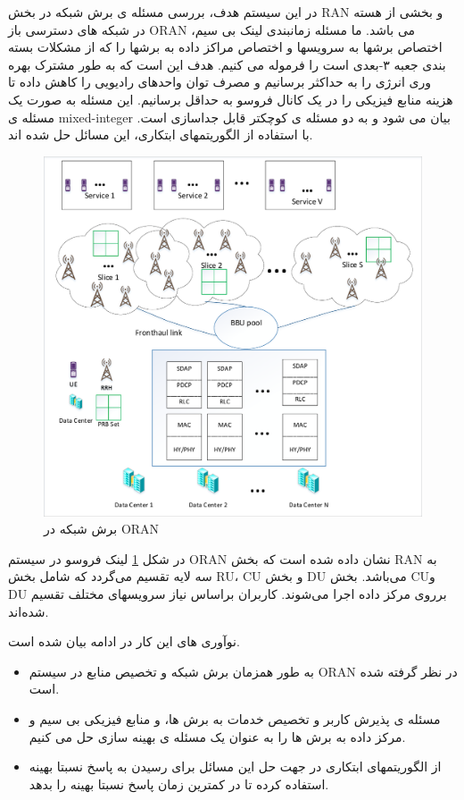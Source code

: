 در این سیستم هدف، بررسی مسئله ی برش شبکه در بخش RAN و بخشی از هسته در شبکه های دسترسی باز
ORAN
می باشد.
ما مسئله زمانبندی لینک بی سیم، اختصاص برشها به سرویسها و اختصاص مراکز داده به برشها را که از مشکلات بسته بندی جعبه  ۳-بعدی است را فرموله می کنیم. 
هدف این است که به طور مشترک بهره وری انرژی را به حداکثر برسانیم و مصرف توان واحدهای رادیویی را کاهش داده تا هزینه منابع فیزیکی را در یک کانال فروسو به حداقل برسانیم.
این مسئله به صورت یک مسئله ی 
mixed-integer
بیان می شود و به دو مسئله ی کوچکتر قابل جداسازی است. با استفاده از الگوریتمهای ابتکاری، این مسائل حل شده اند.
\begin{figure}
	\centering
	\includegraphics[scale=0.55]{./fig/c2.pdf}
	\caption{برش شبکه در ORAN}
	\label{fig:c11}
\end{figure}
در شکل \ref{fig:c11}
لینک فروسو در سیستم ORAN نشان داده شده است که بخش RAN به سه لایه تقسیم می‌گردد که شامل بخش RU، 
CU و
بخش DU می‌باشد.
بخش CUو DU برروی مرکز داده اجرا می‌شوند. کاربران براساس نیاز سرویسهای مختلف تقسیم شده‌اند.

نوآوری های این کار در ادامه بیان شده است.
\begin{itemize}
\item 
به طور همزمان برش شبکه و تخصیص منابع در سیستم
 ORAN
  در نظر گرفته شده است.
\item 
مسئله ی پذیرش کاربر و تخصیص خدمات به برش ها، و منابع فیزیکی بی سیم و مرکز داده به برش ها را به عنوان یک مسئله ی بهینه سازی حل می کنیم.
\item
از الگوریتمهای ابتکاری در جهت حل این مسائل برای رسیدن به پاسخ نسبتا بهینه استفاده کرده تا در کمترین زمان پاسخ نسبتا بهینه را بدهد.
\end{itemize} 
